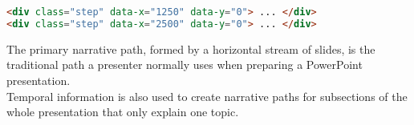 \begin{frame}
\begin{module}[id=narrativePaths]
\begin{lstlisting}[language=HTML]
<div class="step" data-x="1250" data-y="0"> ... </div>
<div class="step" data-x="2500" data-y="0"> ... </div>
\end{lstlisting}

The primary narrative path, formed by a horizontal stream of slides, is the traditional path a presenter normally uses when preparing a PowerPoint presentation.\\ 

Temporal information is also used to create narrative paths for subsections of the whole presentation that only explain one topic.

  \end{module}
\end{frame}
